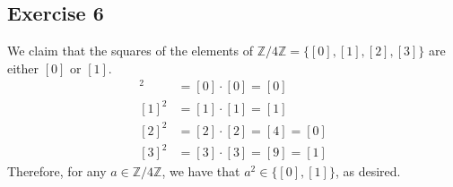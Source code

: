 \subsection*{Exercise 6}
We claim that the squares of the elements of $\mathbb{Z}/4\mathbb{Z} = \{[0],[1],[2],[3]\}$ are either $[0]$ or $[1]$. 
\begin{align*}
    [0]^2 &= [0]\cdot[0] = [0] \\
    [1]^2 &= [1]\cdot[1] = [1] \\
    [2]^2 &= [2]\cdot[2] = [4] = [0] \\
    [3]^2 &= [3]\cdot[3] = [9] = [1]
\end{align*}
 Therefore, for any $a \in \mathbb{Z}/4\mathbb{Z}$, we have that $a^2 \in \{[0],[1]\}$, as desired.
